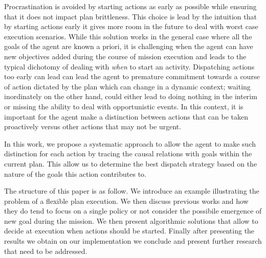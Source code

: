 Procrastination is avoided by starting actions as early as possible
while ensuring that it does not impact plan brittleness. This choice
is lead by the intuition that by starting actions early it gives more
room in the future to deal with worst case execution scenarios. While
this solution works in the general case where all the goals of the
agent are known a priori, it is challenging when the agent can have
new objectives added during the course of mission execution and leads
to the typical dichotomy of dealing with \emph{when} to start an
activity. Dispatching actions too early can lead can lead the agent to
premature commitment towards a course of action dictated by the plan
which can change in a dynamic context; waiting inordinately on the
other hand, could either lead to doing nothing in the interim or
missing the ability to deal with opportunistic events.
In this context, it is important for the agent make a distinction
between actions that can be taken proactively versus other actions
that may not be urgent.  

In this work, we propose a systematic approach to allow the agent to
make such distinction for each action by tracing the causal relations
with goals within the current plan.  This allow us to determine the
best dispatch strategy based on the nature of the goals this action
contributes to.

The structure of this paper is as follow. We introduce an example
illustrating the problem of a flexible plan execution. We then discuss
previous works and how they do tend to focus on a single policy or not
consider the possibile emergence of new goal during the mission. We
then present algorithmic solutions that allow to decide at execution
when actions should be started. Finally after presenting the results
we obtain on our implementation we conclude and present further
research that need to be addressed.




